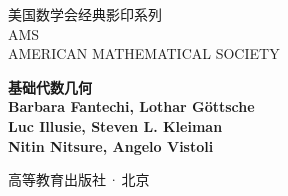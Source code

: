 \begin{titlepage}
\vspace*{4mm}
\noindent\begin{minipage}[t]{35mm}\fontsize{7}{10}\selectfont 美国数学会经典影印系列\\{\Huge\sffamily AMS}\\{\fontsize{4.5}{6}\selectfont AMERICAN MATHEMATICAL SOCIETY}\end{minipage}%
\begin{minipage}[t]{106mm}\raggedright\sffamily\bfseries
{\fontsize{24}{30}\selectfont 基础代数几何\\}
\vspace{3mm}{\Large Fundamental Algebraic Geometry\\}
\vspace{3mm}{\large Grothendieck's FGA Explained\\}
\vspace{8mm}{\large Grothendieck《基础代数几何学（FGA）》解读\\}
\vspace{8mm}\normalfont\sffamily\large
Barbara Fantechi, Lothar Göttsche\\
Luc Illusie, Steven L. Kleiman\\
Nitin Nitsure, Angelo Vistoli
\end{minipage}
\vspace{12mm}\begin{center}{}\end{center}
\vfill\begin{center}\Large 高等教育出版社\,·\,北京\end{center}
\end{titlepage}


